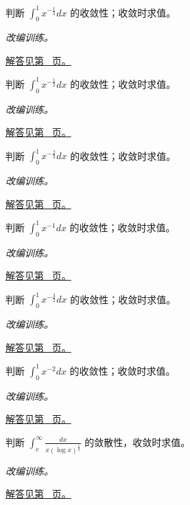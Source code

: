 \documentclass[12pt,fontset=fandol]{ctexart}
\begin{document}
\begin{example}[有限端点的幂奇异性]\label{ex:c19q8}
判断 $\displaystyle\int_0^1x^{-\frac{1}{3}}dx$ 的收敛性；收敛时求值。
\par\textit{改编训练。}\par\hyperref[ans:c19q8]{解答见第~\pageref{ans:c19q8} 页。}
\end{example}
\begin{example}[有限端点的幂奇异性]\label{ex:c19q9}
判断 $\displaystyle\int_0^1x^{-\frac{1}{2}}dx$ 的收敛性；收敛时求值。
\par\textit{改编训练。}\par\hyperref[ans:c19q9]{解答见第~\pageref{ans:c19q9} 页。}
\end{example}
\begin{example}[有限端点的幂奇异性]\label{ex:c19q10}
判断 $\displaystyle\int_0^1x^{-\frac{2}{3}}dx$ 的收敛性；收敛时求值。
\par\textit{改编训练。}\par\hyperref[ans:c19q10]{解答见第~\pageref{ans:c19q10} 页。}
\end{example}
\begin{example}[有限端点的幂奇异性]\label{ex:c19q11}
判断 $\displaystyle\int_0^1x^{-1}dx$ 的收敛性；收敛时求值。
\par\textit{改编训练。}\par\hyperref[ans:c19q11]{解答见第~\pageref{ans:c19q11} 页。}
\end{example}
\begin{example}[有限端点的幂奇异性]\label{ex:c19q12}
判断 $\displaystyle\int_0^1x^{-\frac{3}{2}}dx$ 的收敛性；收敛时求值。
\par\textit{改编训练。}\par\hyperref[ans:c19q12]{解答见第~\pageref{ans:c19q12} 页。}
\end{example}
\begin{example}[有限端点的幂奇异性]\label{ex:c19q13}
判断 $\displaystyle\int_0^1x^{-2}dx$ 的收敛性；收敛时求值。
\par\textit{改编训练。}\par\hyperref[ans:c19q13]{解答见第~\pageref{ans:c19q13} 页。}
\end{example}
\begin{example}[对数修正的临界情形]\label{ex:c19q14}
判断 $\displaystyle\int_e^\infty\frac{dx}{x(\log x)^{\frac{1}{2}}}$ 的敛散性，收敛时求值。
\par\textit{改编训练。}\par\hyperref[ans:c19q14]{解答见第~\pageref{ans:c19q14} 页。}
\end{example}
\end{document}
